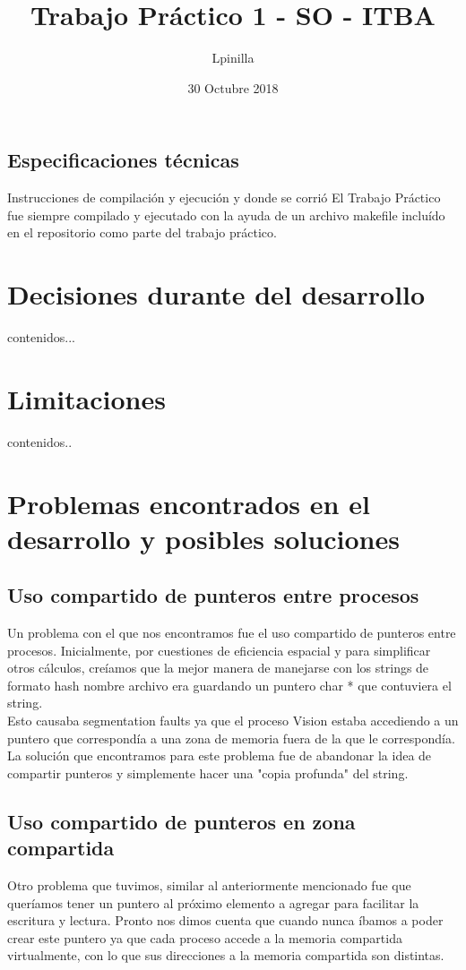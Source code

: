 \documentclass[]{article}
\title{Trabajo Pr\'actico 1 - SO - ITBA}
\author{Lpinilla}
\date{30 Octubre 2018}
\begin{document}
	
\maketitle

\subsection*{Especificaciones t\'ecnicas}
Instrucciones de compilaci\'on y ejecuci\'on y donde se corri\'o
El Trabajo Pr\'actico fue siempre compilado y ejecutado con la ayuda de un archivo makefile inclu\'ido en el repositorio como parte del trabajo pr\'actico.
	
\section*{Decisiones durante del desarrollo}
	contenidos...
	
\section*{Limitaciones}

	contenidos..

\section*{Problemas encontrados en el desarrollo y posibles soluciones}

\subsection{Uso compartido de punteros entre procesos}
Un problema con el que nos encontramos fue el uso compartido de punteros entre procesos. Inicialmente, por cuestiones de eficiencia espacial y para simplificar otros c\'alculos, cre\'iamos que la mejor manera de manejarse con los strings de formato hash nombre archivo era guardando un puntero char * que contuviera el string.\\

Esto causaba segmentation faults ya que el proceso Vision estaba accediendo a un puntero que correspond\'ia a una zona de memoria fuera de la que le correspond\'ia.\\

La soluci\'on que encontramos para este problema fue de abandonar la idea de compartir punteros y simplemente hacer una "copia profunda" del string.

\subsection{Uso compartido de punteros en zona compartida}
Otro problema que tuvimos, similar al anteriormente mencionado fue que quer\'iamos tener un puntero al pr\'oximo elemento a agregar para facilitar la escritura y lectura. Pronto nos dimos cuenta que cuando nunca \'ibamos a poder crear este puntero ya que cada proceso accede a la memoria compartida virtualmente, con lo que sus direcciones a la memoria compartida son distintas.\\
\end{document}
